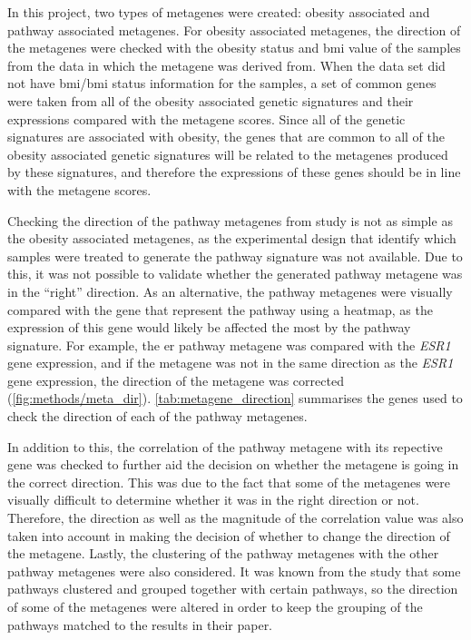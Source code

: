 In this project, two types of metagenes were created: obesity associated and pathway associated metagenes.
For obesity associated metagenes, the direction of the metagenes were checked with the obesity status and \gls{bmi} value of the samples from the data in which the metagene was derived from.
When the data set did not have \gls{bmi}/\gls{bmi} status information for the samples, a set of common genes were taken from all of the obesity associated genetic signatures and their expressions compared with the metagene scores.
Since all of the genetic signatures are associated with obesity, the genes that are common to all of the obesity associated genetic signatures will be related to the metagenes produced by these signatures, and therefore the expressions of these genes should be in line with the metagene scores.

Checking the direction of the pathway metagenes from \citet{Gatza2010a} study is not as simple as the obesity associated metagenes, as the experimental design that identify which samples were treated to generate the pathway signature was not available.
Due to this, it was not possible to validate whether the generated pathway metagene was in the ``right'' direction.
As an alternative, the pathway metagenes were visually compared with the gene that represent the pathway using a heatmap, as the expression of this gene would likely be affected the most by the pathway signature.
For example, the \gls{er} pathway metagene was compared with the \textit{ESR1} gene expression, and if the metagene was not in the same direction as the \textit{ESR1} gene expression, the direction of the metagene was corrected (\cref{fig:methods/meta_dir}).
\cref{tab:metagene_direction} summarises the genes used to check the direction of each of the pathway metagenes.

In addition to this, the correlation of the pathway metagene with its repective gene was checked to further aid the decision on whether the metagene is going in the correct direction.
This was due to the fact that some of the metagenes were visually difficult to determine whether it was in the right direction or not.
Therefore, the direction as well as the magnitude of the correlation value was also taken into account in making the decision of whether to change the direction of the metagene.
Lastly, the clustering of the pathway metagenes with the other pathway metagenes were also considered.
It was known from the \citet{Gatza2010a} study that some pathways clustered and grouped together with certain pathways, so the direction of some of the metagenes were altered in order to keep the grouping of the pathways matched to the results in their paper.

